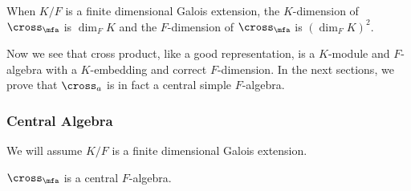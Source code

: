\begin{corollary}
  \label{cor:dim-cross-product}
  When $K/F$ is a finite dimensional Galois extension, the $K$-dimension of $\cross_{\mfa}$ is $\dim_{F}K$ and the $F$-dimension of $\cross_{\mfa}$ is ${\left(\dim_{F}K\right)}^{2}$.
  \leanok
\end{corollary}

Now we see that cross product, like a good representation, is a $K$-module and $F$-algebra with a $K$-embedding and correct $F$-dimension. In the next sections, we prove that $\cross_{a}$ is in fact a central simple $F$-algebra.

\subsubsection{Central Algebra}

We will assume $K/F$ is a finite dimensional Galois extension.

\begin{theorem}[Centrality]\label{thm:cross-product-central}
  $\cross_{\mfa}$ is a central $F$-algebra.
  \leanok
\end{theorem}

